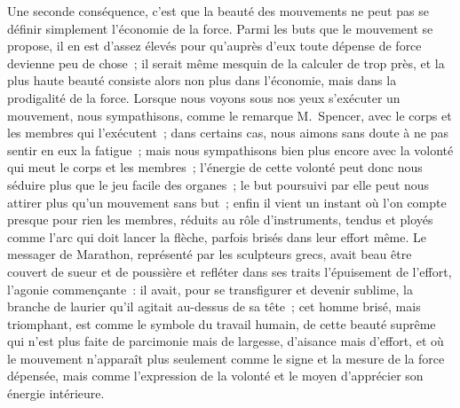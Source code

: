 \documentclass[french,twoside]{book} %
\begin{document}
Une seconde conséquence, c’est que la beauté des mouvements ne peut pas se définir simplement l’économie de la force. Parmi les buts que le mouvement se propose, il en est d’assez élevés pour qu’auprès d’eux toute dépense de force devienne peu de chose ; il serait même mesquin de la calculer de trop près, et la plus haute beauté consiste alors non plus dans l’économie, mais dans la prodigalité de la force. Lorsque nous voyons sous nos yeux s’exécuter un mouvement, nous sympathisons, comme le remarque M. Spencer, avec le corps et les membres qui l’exécutent ; dans certains cas, nous aimons sans doute à ne pas sentir en eux la fatigue ; mais nous sympathisons bien plus  encore avec la volonté qui meut le corps et les membres ; l’énergie de cette volonté peut donc nous séduire plus que le jeu facile des organes ; le but poursuivi par elle peut nous attirer plus qu’un mouvement sans but ; enfin il vient un instant où l’on compte presque pour rien les membres, réduits au rôle d’instruments, tendus et ployés comme l’arc qui doit lancer la flèche, parfois brisés dans leur effort même. Le messager de Marathon, représenté par les sculpteurs grecs, avait beau être couvert de sueur et de poussière et refléter dans ses traits l’épuisement de l’effort, l’agonie commençante : il avait, pour se transfigurer et devenir sublime, la branche de laurier qu’il agitait au-dessus de sa tête ; cet homme brisé, mais triomphant, est comme le symbole du travail humain, de cette beauté suprême qui n’est plus faite de parcimonie mais de largesse, d’aisance mais d’effort, et où le mouvement n’apparaît plus seulement comme le signe et la mesure de la force dépensée, mais comme l’expression de la volonté et le moyen d’apprécier son énergie intérieure.
\end{document}
